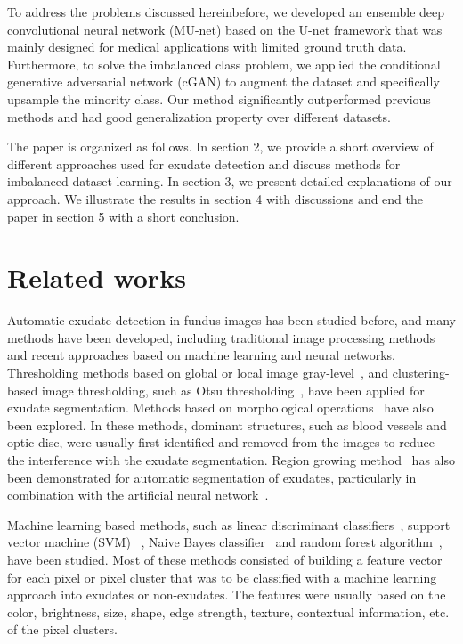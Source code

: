 \documentclass{osa-article}
\begin{document}
To address the problems discussed hereinbefore, we developed an ensemble deep convolutional neural network (MU-net) based on the U-net framework that was mainly designed for medical applications with limited ground truth data. Furthermore, to solve the imbalanced class problem, we applied the conditional generative adversarial network (cGAN) to augment the dataset and specifically upsample the minority class. Our method significantly outperformed previous methods and had good generalization property over different datasets.


The paper is organized as follows. In section 2, we provide a short overview of different approaches used for exudate detection and discuss methods for imbalanced dataset learning. In section 3, we present detailed explanations of our approach. We illustrate the results in section 4 with discussions and end the paper in section 5 with a short conclusion. 


\section{Related works}
Automatic exudate detection in fundus images has been studied before, and many methods have been developed, including traditional image processing methods and recent approaches based on machine learning and neural networks. Thresholding methods based on global or local image gray-level~\cite{phillips1993automated,yazid2012automated,figueiredo2015automated,wisaeng2015automatic}, and clustering-based image thresholding, such as Otsu thresholding~\cite{yazid2012automated,wisaeng2015automatic}, have been applied for exudate segmentation. Methods based on morphological operations~\cite{walter2002contribution,sopharak2008automatic,welfer2010coarse,harangi2014automatic,imani2016novel,
fraz2017multiscale} have also been explored. In these methods, dominant structures, such as blood vessels and optic disc, were usually first identified and removed from the images to reduce the interference with the exudate segmentation. Region growing method~\cite{ege2000screening,sinthanayothin2002automated,li2004automated,usher2004automated} has also been demonstrated for automatic segmentation of exudates, particularly in combination with the artificial neural network~\cite{usher2004automated}.

Machine learning based methods, such as linear discriminant classifiers~\cite{sanchez2008novel,niemeijer2007automated}, support vector machine (SVM) ~\cite{fleming2007automated,giancardo2012exudate}, Naive Bayes classifier~\cite{harangi2012automatic} and random forest algorithm~\cite{zhang2014exudate}, have been studied. Most of these methods consisted of building a feature vector for each pixel or pixel cluster that was to be classified with a machine learning approach into exudates or non-exudates. The features were usually based on the color, brightness, size, shape, edge strength, texture, contextual information, etc. of the pixel clusters.
\end{document}
